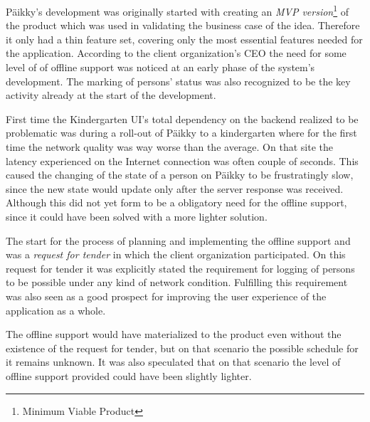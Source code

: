 
Päikky's development was originally started with creating an \textit{MVP version}\footnote{Minimum Viable Product} of the product which was used in validating the business case of the idea. Therefore it only had a thin feature set, covering only the most essential features needed for the application. According to the client organization's CEO the need for some level of of offline support was noticed at an early phase of the system's development. The marking of persons' status was also recognized to be the key activity already at the start of the development.

First time the Kindergarten UI's total dependency on the backend realized to be problematic was during a roll-out of Päikky to a kindergarten where for the first time the network quality was way worse than the average. On that site the latency experienced on the Internet connection was often couple of seconds. This caused the changing of the state of a person on Päikky to be frustratingly slow, since the new state would update only after the server response was received. Although this did not yet form to be a obligatory need for the offline support, since it could have been solved with a more lighter solution.

The start for the process of planning and implementing the offline support and was a \textit{request for tender} in which the client organization participated. On this request for tender it was explicitly stated the requirement for logging of persons to be possible under any kind of network condition. Fulfilling this requirement was also seen as a good prospect for improving the user experience of the application as a whole.

The offline support would have materialized to the product even without the existence of the request for tender, but on that scenario the possible schedule for it remains unknown. It was also speculated that on that scenario the level of offline support provided could have been slightly lighter.

















